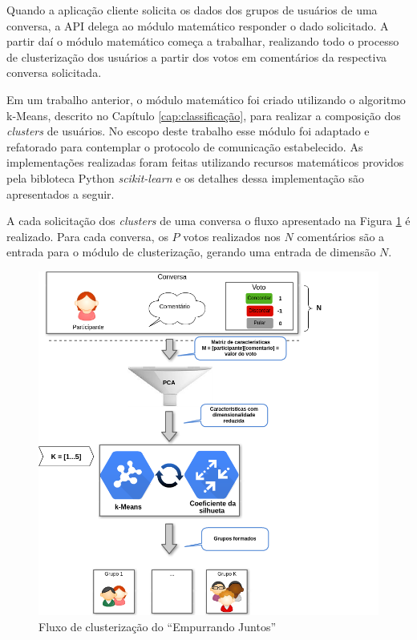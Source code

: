     Quando a aplicação cliente solicita os dados dos grupos de usuários de uma conversa,
    a API delega ao módulo matemático responder o dado solicitado. A partir daí o módulo
    matemático começa a trabalhar, realizando todo o processo de clusterização dos usuários
    a partir dos votos em comentários da respectiva conversa solicitada.
    
    Em um trabalho anterior, o módulo matemático foi criado utilizando o algoritmo k-Means, descrito no Capítulo \ref{cap:classificação},
    para realizar a composição dos \textit{clusters} de usuários. No escopo deste trabalho esse módulo foi adaptado e refatorado para contemplar
    o protocolo de comunicação estabelecido.
    As implementações realizadas foram feitas utilizando recursos matemáticos
    providos pela bibloteca Python \textit{scikit-learn}\footnotemark 
    e os detalhes dessa implementação são apresentados a seguir.
    
    
    A cada solicitação dos \textit{clusters} de uma conversa
    o fluxo apresentado na Figura \ref{fig:resumo_clusterizao_ej} é realizado.
    Para cada conversa, os $P$ votos realizados nos $N$ comentários são a entrada para o módulo de clusterização, 
    gerando uma entrada de dimensão $N$. 
    
    
    \begin{figure}[h!]
      \centering
      \includegraphics[scale=0.6]{figuras/resumo_clusterizao_ej.png}
      \caption{Fluxo de clusterização do ``Empurrando Juntos''}
      \label{fig:resumo_clusterizao_ej}
    \end{figure}
  

